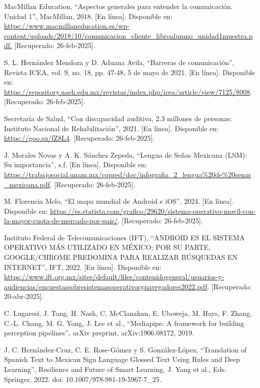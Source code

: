 \cleardoublepage
{}
\renewcommand{\bibname}{Bibliografía} %

\begingroup

\begin{thebibliography}{200}
    MacMillan Education, “Aspectos generales para entender la comunicación. Unidad 1”, MacMillan, 2018. [En línea]. Disponible en: \url{https://www.macmillaneducation.es/wp-content/uploads/2018/10/comunicacion_cliente_libroalumno_unidad1muestra.pdf.} [Recuperado: 26-feb-2025].

    S. L. Hernández Mendoza y D. Aduana Avila, “Barreras de comunicación”, Revista ICEA, vol. 9, no. 18, pp. 47-48, 5 de mayo de 2021. [En línea]. Disponible en: \url{https://repository.uaeh.edu.mx/revistas/index.php/icea/article/view/7125/8008}. [Recuperado: 26-feb-2025].

    Secretaría de Salud, “Con discapacidad auditiva, 2.3 millones de personas: Instituto Nacional de Rehabilitación”, 2021. [En línea]. Disponible en: \url{https://goo.su/fZ8L4}. [Recuperado: 26-feb-2025].

    J. Morales Novas y A. K. Sánchez Zepeda, “Lengua de Señas Mexicana (LSM): Su importancia”, s.f. [En línea]. Disponible en: \url{https://trabajosocial.unam.mx/copred/doc/infografia_2_lengua%20de%20senas_mexicana.pdf}. [Recuperado: 26-feb-2025].

    M. Florencia Melo, “El mapa mundial de Android e iOS”, 2024. [En línea]. Disponible en: \url{https://es.statista.com/grafico/29620/sistema-operativo-movil-con-la-mayor-cuota-de-mercado-por-pais/}. [Recuperado: 26-feb-2025].

    Instituto Federal de Telecomunicaciones (IFT), “ANDROID ES EL SISTEMA OPERATIVO MÁS UTILIZADO EN MÉXICO; POR SU PARTE, GOOGLE/CHROME PREDOMINA PARA REALIZAR BÚSQUEDAS EN INTERNET”, IFT, 2022. [En línea]. Disponible en: \url{https://www.ift.org.mx/sites/default/files/contenidogeneral/usuarios-y-audiencias/encuestassobresistemasoperativosynavegadores2022.pdf}. [Recuperado: 20-abr-2025].

    C. Lugaresi, J. Tang, H. Nash, C. McClanahan, E. Uboweja, M. Hays, F. Zhang, C.-L. Chang, M. G. Yong, J. Lee et al., “Mediapipe: A framework for building perception pipelines”, arXiv preprint, arXiv:1906.08172, 2019.

    J. C. Hernández-Cruz, C. E. Rose-Gómez y S. González-López, “Translation of Spanish Text to Mexican Sign Language Glossed Text Using Rules and Deep Learning”, Resilience and Future of Smart Learning, J. Yang et al., Eds. Springer, 2022. doi: 10.1007/978-981-19-5967-7\_25.


\end{thebibliography}
